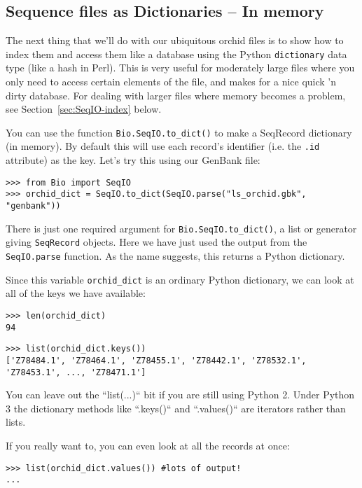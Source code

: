 \subsection{Sequence files as Dictionaries -- In memory}
\label{SeqIO:to_dict}

The next thing that we'll do with our ubiquitous orchid files is to show how
to index them and access them like a database using the Python \verb|dictionary|
data type (like a hash in Perl). This is very useful for moderately large files
where you only need to access certain elements of the file, and makes for a nice
quick 'n dirty database. For dealing with larger files where memory becomes a
problem, see Section~\ref{sec:SeqIO-index} below.

You can use the function \verb|Bio.SeqIO.to_dict()| to make a SeqRecord dictionary
(in memory).  By default this will use each record's identifier (i.e. the \verb|.id|
attribute) as the key.  Let's try this using our GenBank file:

\begin{verbatim}
>>> from Bio import SeqIO
>>> orchid_dict = SeqIO.to_dict(SeqIO.parse("ls_orchid.gbk", "genbank"))
\end{verbatim}

There is just one required argument for \verb|Bio.SeqIO.to_dict()|, a list or
generator giving \verb|SeqRecord| objects. Here we have just used the output
from the \verb|SeqIO.parse| function. As the name suggests, this returns a
Python dictionary.

Since this variable \verb|orchid_dict| is an ordinary Python dictionary,
we can look at all of the keys we have available:

\begin{verbatim}
>>> len(orchid_dict)
94
\end{verbatim}
\begin{verbatim}
>>> list(orchid_dict.keys())
['Z78484.1', 'Z78464.1', 'Z78455.1', 'Z78442.1', 'Z78532.1', 'Z78453.1', ..., 'Z78471.1']
\end{verbatim}

You can leave out the ``list(...)`` bit if you are still using Python 2.
Under Python 3 the dictionary methods like ``.keys()`` and ``.values()``
are iterators rather than lists.

If you really want to, you can even look at all the records at once:
\begin{verbatim}
>>> list(orchid_dict.values()) #lots of output!
...
\end{verbatim}

